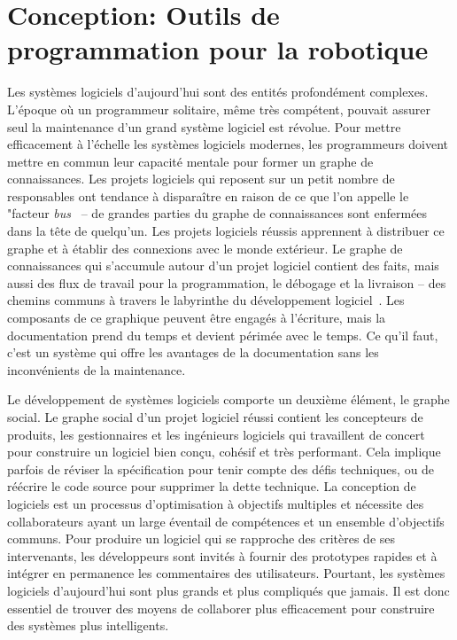 \section{Conception: Outils de programmation pour la robotique}

Les systèmes logiciels d'aujourd'hui sont des entités profondément complexes. L'époque où un programmeur solitaire, même très compétent, pouvait assurer seul la maintenance d'un grand système logiciel est révolue. Pour mettre efficacement à l'échelle les systèmes logiciels modernes, les programmeurs doivent mettre en commun leur capacité mentale pour former un graphe de connaissances. Les projets logiciels qui reposent sur un petit nombre de responsables ont tendance à disparaître en raison de ce que l'on appelle le "facteur \textit{bus}~\citep{cosentino2015assessing} -- de grandes parties du graphe de connaissances sont enfermées dans la tête de quelqu'un. Les projets logiciels réussis apprennent à distribuer ce graphe et à établir des connexions avec le monde extérieur. Le graphe de connaissances qui s'accumule autour d'un projet logiciel contient des faits, mais aussi des flux de travail pour la programmation, le débogage et la livraison -- des chemins communs à travers le labyrinthe du développement logiciel~\citep{naur1985programming}. Les composants de ce graphique peuvent être engagés à l'écriture, mais la documentation prend du temps et devient périmée avec le temps. Ce qu'il faut, c'est un système qui offre les avantages de la documentation sans les inconvénients de la maintenance.

Le développement de systèmes logiciels comporte un deuxième élément, le graphe social. Le graphe social d'un projet logiciel réussi contient les concepteurs de produits, les gestionnaires et les ingénieurs logiciels qui travaillent de concert pour construire un logiciel bien conçu, cohésif et très performant. Cela implique parfois de réviser la spécification pour tenir compte des défis techniques, ou de réécrire le code source pour supprimer la dette technique. La conception de logiciels est un processus d'optimisation à objectifs multiples et nécessite des collaborateurs ayant un large éventail de compétences et un ensemble d'objectifs communs. Pour produire un logiciel qui se rapproche des critères de ses intervenants, les développeurs sont invités à fournir des prototypes rapides et à intégrer en permanence les commentaires des utilisateurs. Pourtant, les systèmes logiciels d'aujourd'hui sont plus grands et plus compliqués que jamais. Il est donc essentiel de trouver des moyens de collaborer plus efficacement pour construire des systèmes plus intelligents.

